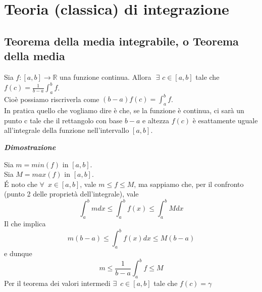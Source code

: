 \documentclass{article}
\theoremstyle{definition}
\newcommand{\R}{\mathbb{R}}
\begin{document}
\section{Teoria (classica) di integrazione}
\subsection{Teorema della media integrabile, o Teorema della media}
Sia $f:[a,b] \to \R$ una funzione continua. Allora $\,\, \exists \,\, c \in [a,b]$ tale che $f(c)=\frac{1}{b-a}\int_a^b f$.
\\
Cioè possiamo riscriverla come $(b-a)f(c)=\int_a^b f$.
\\
In pratica quello che vogliamo dire è che, se la funzione è continua, ci sarà un punto c tale che il rettangolo con base $b-a$ e altezza $f(c)$ è esattamente uguale all'integrale della funzione nell'intervallo $[a,b]$.
\\
\begin{center}
    \textbf{\textit{Dimostrazione}}
\end{center}
Sia $m=min(f)$ in $[a,b]$.
\\
Sia $M=max(f)$ in $[a,b]$.
\\
\'E noto che $\forall \,\,\, x \in [a,b]$, vale $m \leqslant f \leqslant M$, ma sappiamo che, per il confronto (punto 2 delle proprietà dell'integrale), vale
\begin{equation*}
    \int_a^b m dx \leqslant \int_a^b f(x) \leqslant \int_a^b M dx
\end{equation*}
Il che implica 
\begin{equation*}
    m(b-a) \leqslant \int_a^b f(x) dx \leqslant M(b-a)
\end{equation*}
e dunque
\begin{equation*}
    m \leqslant \frac{1}{b-a}\int_a^b f \leqslant M
\end{equation*}
Per il teorema dei valori intermedi $\exists \,\,\, c \in [a,b]$ tale che $f(c)=\gamma$
\end{document}
